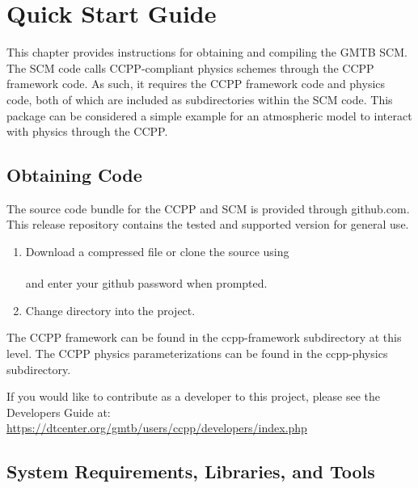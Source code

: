 \chapter{Quick Start Guide}
\label{chapter: quick}
\setlength{\parskip}{12pt}

This chapter provides instructions for obtaining and compiling 
the GMTB SCM. The SCM code calls CCPP-compliant
physics schemes through the CCPP framework code. As such, it requires the
CCPP framework code and physics code, both of which are included as 
subdirectories within the SCM code. This package can be considered a simple example
for an atmospheric model to interact with physics through the CCPP.

\section{Obtaining Code}

The source code bundle for the CCPP and SCM is provided through github.com.  This release repository contains the tested and supported version for general use.  

\begin{enumerate}

	\item Download a compressed file or clone the source using\\

	\\

	and enter your github password when prompted.\\

	\item Change directory into the project.\\


\end{enumerate}

The CCPP framework can be found in the ccpp-framework subdirectory at this level.  The CCPP physics parameterizations can be found in the ccpp-physics subdirectory.

If you would like to contribute as a developer to this project, please see the Developers Guide at:\\

\url{https://dtcenter.org/gmtb/users/ccpp/developers/index.php}


\section{System Requirements, Libraries, and Tools}
\label{section: systemrequirements}

